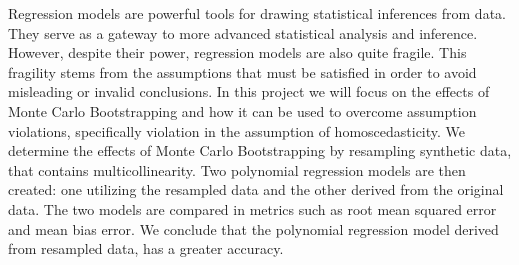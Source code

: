 Regression models are powerful tools for drawing statistical inferences from data. They serve as a gateway to more advanced statistical analysis and inference. However, despite their power, regression models are also quite fragile. This fragility stems from the assumptions that must be satisfied in order to avoid misleading or invalid conclusions. In this project we will focus on the effects of Monte Carlo Bootstrapping and how it can be used to overcome assumption violations, specifically violation in the assumption of homoscedasticity. We determine the effects of Monte Carlo Bootstrapping by resampling synthetic data, that contains multicollinearity. Two polynomial regression models are then created: one utilizing the resampled data and the other derived from the original data. The two models are compared in metrics such as root mean squared error and mean bias error. We conclude that the polynomial regression model derived from resampled data, has a greater accuracy. 